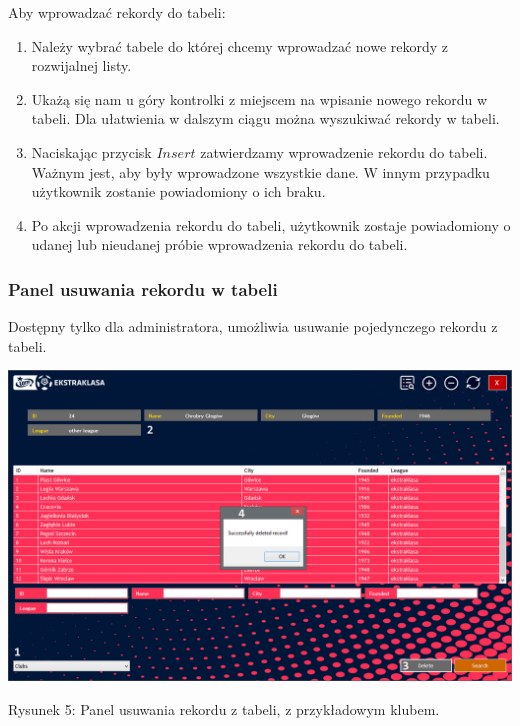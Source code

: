 \documentclass[12pt,a4paper]{article}
\begin{document}
    Aby wprowadzać rekordy do tabeli:
    \begin{enumerate}
        \item Należy wybrać tabele do której chcemy wprowadzać nowe rekordy z rozwijalnej listy.
        \item Ukażą się nam u góry kontrolki z miejscem na wpisanie nowego rekordu w tabeli. Dla ułatwienia w dalszym ciągu można wyszukiwać rekordy w tabeli.
        \item Naciskając przycisk $Insert$ zatwierdzamy wprowadzenie rekordu do tabeli. Ważnym jest, aby były wprowadzone wszystkie dane. W innym przypadku użytkownik zostanie powiadomiony o ich braku.
        \item Po akcji wprowadzenia rekordu do tabeli, użytkownik zostaje powiadomiony o udanej lub nieudanej próbie wprowadzenia rekordu do tabeli.
    \end{enumerate}

    \newpage

    \subsubsection{Panel usuwania rekordu w tabeli}
    Dostępny tylko dla administratora, umożliwia usuwanie pojedynczego rekordu z tabeli.
    \begin{center}
        \includegraphics[scale=0.47]{delete-panel.png}
        \begin{flushleft}
            \begin{scriptsize}
            \begin{list}{}{\leftmargin=13.5em}\raggedright\item\relax
            Rysunek 5: Panel usuwania rekordu z tabeli, z przykładowym klubem.
            \end{list}
            \end{scriptsize}
        \end{flushleft}
    \end{center}
\end{document}

